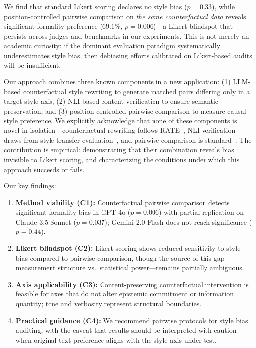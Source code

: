 \documentclass[11pt,a4paper]{article}
\begin{document}
We find that standard Likert scoring declares no style bias ($p=0.33$), while position-controlled pairwise comparison on \emph{the same counterfactual data} reveals significant formality preference ($69.1\%$, $p=0.006$)---a Likert blindspot that persists across judges and benchmarks in our experiments.
This is not merely an academic curiosity: if the dominant evaluation paradigm systematically underestimates style bias, then debiasing efforts calibrated on Likert-based audits will be insufficient.

Our approach combines three known components in a new application: (1) LLM-based counterfactual style rewriting to generate matched pairs differing only in a target style axis, (2) NLI-based content verification to ensure semantic preservation, and (3) position-controlled pairwise comparison to measure causal style preference.
We explicitly acknowledge that none of these components is novel in isolation---counterfactual rewriting follows RATE~\citep{feuer2025rate}, NLI verification draws from style transfer evaluation~\citep{mir2019evaluating}, and pairwise comparison is standard~\citep{zheng2023judging}.
The contribution is empirical: demonstrating that their combination reveals bias invisible to Likert scoring, and characterizing the conditions under which this approach succeeds or fails.

Our key findings:
\begin{enumerate}[nosep,leftmargin=*]
\item \textbf{Method viability (C1):} Counterfactual pairwise comparison detects significant formality bias in GPT-4o ($p=0.006$) with partial replication on Claude-3.5-Sonnet ($p=0.037$); Gemini-2.0-Flash does not reach significance ($p=0.44$).
\item \textbf{Likert blindspot (C2):} Likert scoring shows reduced sensitivity to style bias compared to pairwise comparison, though the source of this gap---measurement structure vs.\ statistical power---remains partially ambiguous.
\item \textbf{Axis applicability (C3):} Content-preserving counterfactual intervention is feasible for axes that do not alter epistemic commitment or information quantity; tone and verbosity represent structural boundaries.
\item \textbf{Practical guidance (C4):} We recommend pairwise protocols for style bias auditing, with the caveat that results should be interpreted with caution when original-text preference aligns with the style axis under test.
\end{enumerate}
\end{document}
